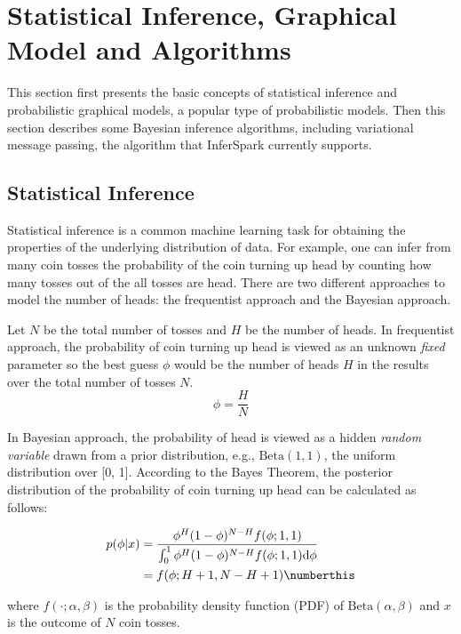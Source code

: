 \section{Statistical Inference, Graphical Model and Algorithms}

This section first presents the basic concepts of statistical inference and
probabilistic graphical models, a popular type of probabilistic models. Then
this section describes some Bayesian inference algorithms, including
variational message passing, the algorithm that InferSpark currently supports.

\subsection{Statistical Inference}

Statistical inference is a common machine learning task for obtaining the
properties of the underlying distribution of data. For example, one can infer
from many coin tosses the probability of the coin turning up head by counting
how many tosses out of the all tosses are head. There are two different
approaches to model the number of heads: the frequentist approach and the
Bayesian approach.


Let $N$ be the total number of tosses and $H$ be the number of heads. In
frequentist approach, the probability of coin turning up head is viewed as an
unknown \emph{fixed} parameter so the best guess $\phi$ would be the number of heads $H$ in the
results over the total number of tosses $N$.
\begin{equation*}
	\phi = \frac{H}{N}
\end{equation*}

In Bayesian approach, the probability of head is viewed as a hidden \emph{random
variable} drawn from a prior distribution, e.g., $\mathrm{Beta}(1, 1)$, the
uniform distribution over [0, 1]. According to the Bayes Theorem, the
posterior distribution of the probability of coin turning up head can be
calculated as follows:

\begin{align*}
	p(\phi|x) &= \frac{ \phi^H (1-\phi)^{N-H} f(\phi; 1, 1)}{\int_0^1 \phi^H
	(1-\phi)^{N-H} f(\phi; 1, 1)\mathrm{d}\phi} \\ &= f(\phi; H+1, N-H+1) \numberthis
	\label{eqn:coin_posterior}
\end{align*}

\noindent
where $f(\cdot; \alpha, \beta)$ is the probability density function (PDF) of
$\mathrm{Beta}(\alpha, \beta)$ and $x$ is the outcome of $N$ coin tosses.

